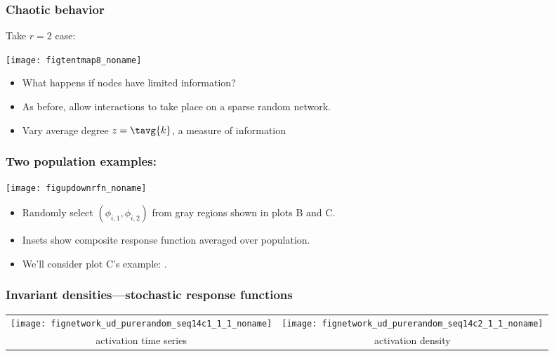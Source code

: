 \begin{frame}
  \frametitle{Chaotic behavior}

  Take $r=2$ case:
  \begin{center}
    \texttt{[image: figtentmap8\_noname]} 
  \end{center}

  \begin{itemize}
  \item<2-> What happens if nodes have limited information?
  \item<3-> As before, allow interactions to take place on a sparse random network.
  \item<4-> Vary average degree $z=\tavg{k}$, a measure of information
  \end{itemize}

\end{frame}

\begin{frame}
  \frametitle{Two population examples:}

  \texttt{[image: figupdownrfn\_noname]} 
    
  \begin{itemize}
    \item<1-> 
      Randomly select $(\phi_{i,1},\phi_{i,2})$ from
      gray regions shown in plots B and C.
    \item<1->
      Insets show composite response function
      averaged over population.
    \item<2->
      We'll consider plot C's example: .
  \end{itemize}

\end{frame}

\begin{frame}
  \frametitle{Invariant densities---stochastic response functions}

  \centering
  \begin{tabular}{cc}
    \texttt{[image: fignetwork\_ud\_purerandom\_seq14c1\_1\_1\_noname]} &
    \texttt{[image: fignetwork\_ud\_purerandom\_seq14c2\_1\_1\_noname]} \\
    activation time series & activation density \\
  \end{tabular}

\end{frame}

